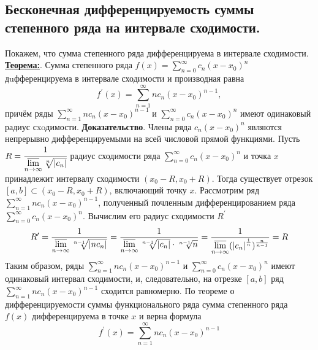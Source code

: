 \documentclass[a4paper,12pt]{article} %
\begin{document}
\subsection{Бесконечная дифференцируемость суммы степенного ряда на интервале сходимости.}
Покажем, что сумма степенного ряда дифференцируема в интервале сходимости.
\underline{\textbf{Теорема:}}. Сумма степенного ряда $f(x)=\sum\limits_{n=0}^{\infty} c_{n}\left(x-x_{0}\right)^{n}$ дuфференцируема в интервале сходимости и производная равна
\begin{equation*}
f^{\prime}(x)=\sum\limits_{n=1}^{\infty} n c_{n}\left(x-x_{0}\right)^{n-1},
\end{equation*}
причём ряды $\sum\limits_{n=1}^{\infty} n c_{n}\left(x-x_{0}\right)^{n-1}$ и $\sum\limits_{n=0}^{\infty} c_{n}\left(x-x_{0}\right)^{n}$ имеют одинаковый радиус сxoдимости.
\textbf{Доказательство}. Члены ряда $c_{n}\left(x-x_{0}\right)^{n}$ являются непрерывно дифференцируемыми на всей числовой прямой функциями. Пусть $R=\cfrac{1}{\varlimsup\limits_{n \rightarrow \infty} \sqrt[n]{\left|c_{n}\right|}}$ радиус сходимости ряда $\sum\limits_{n=0}^{\infty} c_{n}\left(x-x_{0}\right)^{n}$ и точка $x$ принадлежит интервалу сходимости $\left(x_{0}-R, x_{0}+R\right) .$ Тогда существует отрезок $[a, b] \subset\left(x_{0}-R, x_{0}+R\right)$, включающий точку $x .$
Рассмотрим ряд $\sum\limits_{n=1}^{\infty} n c_{n}\left(x-x_{0}\right)^{n-1}$, полученный почленным дифференцированием ряда $\sum\limits_{n=0}^{\infty} c_{n}\left(x-x_{0}\right)^{n} .$ Вычислим его радиус сходимости $R^{\prime}$
\begin{equation*}
R^{\prime}=\frac{1}{\varlimsup \limits_{n \rightarrow \infty} \sqrt[n-1]{\left|n c_{n}\right|}} = \frac{1}{\varlimsup \limits_{n \rightarrow \infty} \sqrt[n-1]{\left|c_{n}\right|}\cdot \sqrt[n-1]{n}} = \frac{1}{\varlimsup \limits_{n \rightarrow \infty}(\left|c_{n}\right|^{\frac{1}{n}})^{\frac{n}{n-1}}}=R
\end{equation*}
Таким образом, ряды $\sum\limits_{n=1}^{\infty} n c_{n}\left(x-x_{0}\right)^{n-1}$ и $\sum\limits_{n=0}^{\infty} c_{n}\left(x-x_{0}\right)^{n}$ имеют одинаковый интервал сходимости, и, следовательно, на отрезке $[a, b]$ ряд $\sum\limits_{n=1}^{\infty} n c_{n}\left(x-x_{0}\right)^{n-1}$ сходится равномерно. По теореме о дифференцируемости суммы функционального ряда сумма степенного ряда $f(x)$ дифференцируема в точке $x$ и верна формула
\begin{equation*}
f^{\prime}(x)=\sum\limits_{n=1}^{\infty} n c_{n}\left(x-x_{0}\right)^{n-1}
\end{equation*}
\end{document}
